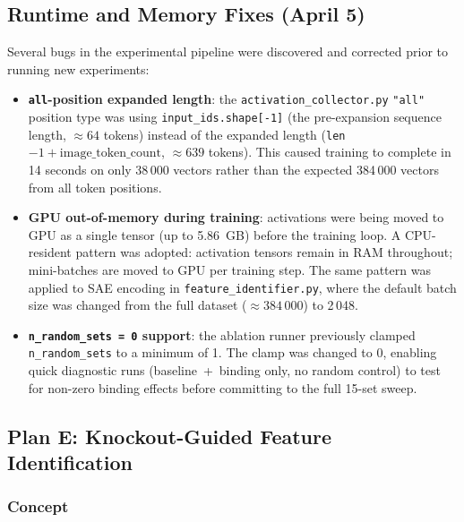 \documentclass[11pt,a4paper]{article}
\begin{document}
\subsection{Runtime and Memory Fixes (April 5)}

Several bugs in the experimental pipeline were discovered and corrected prior to running new
experiments:

\begin{itemize}[noitemsep]
  \item \textbf{\texttt{all}-position expanded length}: the \texttt{activation\_collector.py}
    \texttt{"all"} position type was using \texttt{input\_ids.shape[-1]} (the pre-expansion
    sequence length, $\approx 64$ tokens) instead of the expanded length
    (\texttt{len} $- 1 + \text{image\_token\_count}$, $\approx 639$ tokens).
    This caused training to complete in 14 seconds on only 38\,000 vectors rather than the
    expected 384\,000 vectors from all token positions.

  \item \textbf{GPU out-of-memory during training}: activations were being moved to GPU as a
    single tensor (up to 5.86~GB) before the training loop. A CPU-resident pattern was adopted:
    activation tensors remain in RAM throughout; mini-batches are moved to GPU per training step.
    The same pattern was applied to SAE encoding in \texttt{feature\_identifier.py}, where the
    default batch size was changed from the full dataset ($\approx 384\,000$) to 2\,048.

  \item \textbf{\texttt{n\_random\_sets = 0} support}: the ablation runner previously clamped
    \texttt{n\_random\_sets} to a minimum of 1. The clamp was changed to 0, enabling
    quick diagnostic runs (baseline~+~binding only, no random control) to test for non-zero
    binding effects before committing to the full 15-set sweep.
\end{itemize}

\subsection{Plan E: Knockout-Guided Feature Identification}

\subsubsection{Concept}
\end{document}

